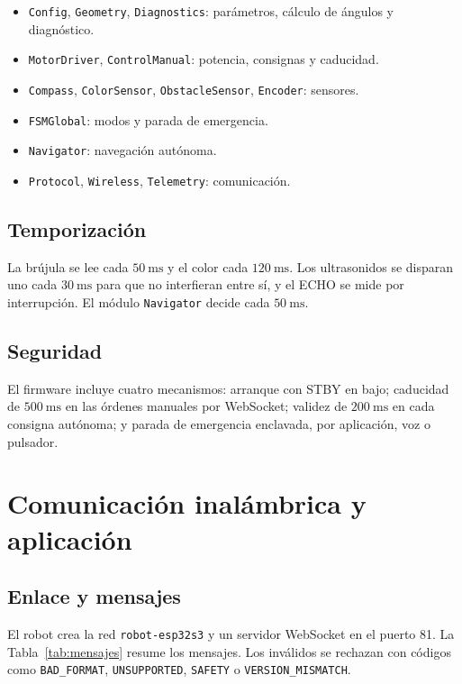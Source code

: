 \documentclass[journal]{IEEEtran}
\begin{document}
\begin{itemize}
    \item \texttt{Config}, \texttt{Geometry}, \texttt{Diagnostics}: parámetros, cálculo de ángulos y diagnóstico.
    \item \texttt{MotorDriver}, \texttt{ControlManual}: potencia, consignas y caducidad.
    \item \texttt{Compass}, \texttt{ColorSensor}, \texttt{ObstacleSensor}, \texttt{Encoder}: sensores.
    \item \texttt{FSMGlobal}: modos y parada de emergencia.
    \item \texttt{Navigator}: navegación autónoma.
    \item \texttt{Protocol}, \texttt{Wireless}, \texttt{Telemetry}: comunicación.
\end{itemize}

\subsection{Temporización}

La brújula se lee cada $50~\mathrm{ms}$ y el color cada $120~\mathrm{ms}$. Los ultrasonidos se disparan uno cada $30~\mathrm{ms}$ para que no interfieran entre sí, y el ECHO se mide por interrupción. El módulo \texttt{Navigator} decide cada $50~\mathrm{ms}$.

\subsection{Seguridad}

El firmware incluye cuatro mecanismos: arranque con STBY en bajo; caducidad de $500~\mathrm{ms}$ en las órdenes manuales por WebSocket; validez de $200~\mathrm{ms}$ en cada consigna autónoma; y parada de emergencia enclavada, por aplicación, voz o pulsador.

\section{Comunicación inalámbrica y aplicación}

\subsection{Enlace y mensajes}

El robot crea la red \texttt{robot-esp32s3} y un servidor WebSocket en el puerto 81. La Tabla~\ref{tab:mensajes} resume los mensajes. Los inválidos se rechazan con códigos como \texttt{BAD\_FORMAT}, \texttt{UNSUPPORTED}, \texttt{SAFETY} o \texttt{VERSION\_MISMATCH}.
\end{document}
